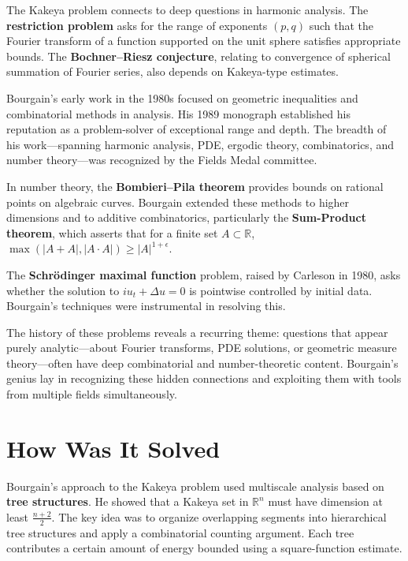 The Kakeya problem connects to deep questions in harmonic analysis.
The \textbf{restriction problem} asks for the range of exponents
$(p,q)$ such that the Fourier transform of a function supported on
the unit sphere satisfies appropriate bounds.  The
\textbf{Bochner--Riesz conjecture}, relating to convergence of
spherical summation of Fourier series, also depends on Kakeya-type
estimates.

Bourgain's early work in the 1980s focused on geometric
inequalities and combinatorial methods in analysis.  His 1989
monograph established his reputation as a problem-solver of
exceptional range and depth.  The breadth of his work---spanning
harmonic analysis, PDE, ergodic theory, combinatorics, and number
theory---was recognized by the Fields Medal committee.

In number theory, the \textbf{Bombieri--Pila theorem} provides
bounds on rational points on algebraic curves.  Bourgain extended
these methods to higher dimensions and to additive combinatorics,
particularly the \textbf{Sum-Product theorem}, which asserts that
for a finite set $A \subset \mathbb{R}$,
$\max(|A+A|, |A \cdot A|) \geq |A|^{1+\epsilon}$.

The \textbf{Schr\"{o}dinger maximal function} problem, raised by
Carleson in 1980, asks whether the solution to
$iu_t + \Delta u = 0$ is pointwise controlled by initial data.
Bourgain's techniques were instrumental in resolving this.

The history of these problems reveals a recurring theme: questions
that appear purely analytic---about Fourier transforms, PDE
solutions, or geometric measure theory---often have deep
combinatorial and number-theoretic content.  Bourgain's genius lay
in recognizing these hidden connections and exploiting them with
tools from multiple fields simultaneously.

\section{How Was It Solved}

Bourgain's approach to the Kakeya problem used multiscale analysis
based on \textbf{tree structures}.  He showed that a Kakeya set in
$\mathbb{R}^n$ must have dimension at least $\frac{n+2}{2}$.
The key idea was to organize overlapping segments into hierarchical
tree structures and apply a combinatorial counting argument.  Each
tree contributes a certain amount of energy bounded using a
square-function estimate.

